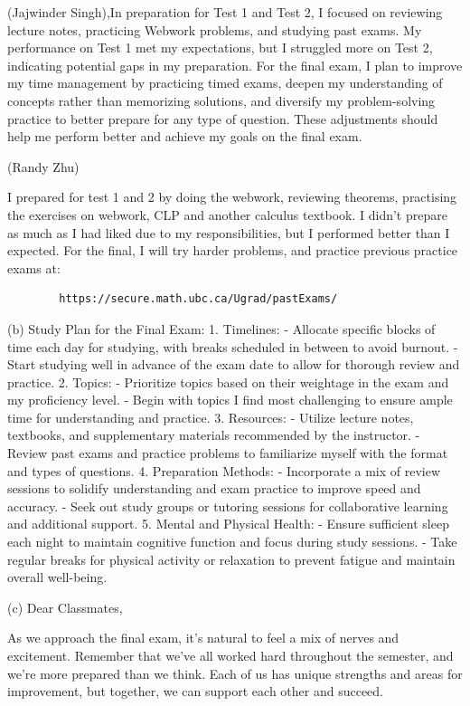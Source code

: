 \documentclass[answers]{exam}
\begin{document}
\begin{questions}
\begin{solution}
    (Jajwinder Singh),In preparation for Test 1 and Test 2, I focused on reviewing lecture notes, practicing Webwork problems, and studying past exams. My performance on Test 1 met my expectations, but I struggled more on Test 2, indicating potential gaps in my preparation. For the final exam, I plan to improve my time management by practicing timed exams, deepen my understanding of concepts rather than memorizing solutions, and diversify my problem-solving practice to better prepare for any type of question. These adjustments should help me perform better and achieve my goals on the final exam.

    (Randy Zhu)

    I prepared for test 1 and 2 by doing the webwork, reviewing theorems, practising the exercises on webwork, CLP and another calculus textbook. I didn't prepare as much as I had liked due to my responsibilities, but I performed better than I expected. For the final, I will try harder problems, and practice previous practice exams at: \begin{verbatim}
        https://secure.math.ubc.ca/Ugrad/pastExams/
    \end{verbatim}

    (b) Study Plan for the Final Exam:
    1. Timelines:
       - Allocate specific blocks of time each day for studying, with breaks scheduled in between to avoid burnout.
       - Start studying well in advance of the exam date to allow for thorough review and practice.
    2. Topics:
       - Prioritize topics based on their weightage in the exam and my proficiency level.
       - Begin with topics I find most challenging to ensure ample time for understanding and practice.
    3. Resources:
       - Utilize lecture notes, textbooks, and supplementary materials recommended by the instructor.
       - Review past exams and practice problems to familiarize myself with the format and types of questions.
    4. Preparation Methods:
       - Incorporate a mix of review sessions to solidify understanding and exam practice to improve speed and accuracy.
       - Seek out study groups or tutoring sessions for collaborative learning and additional support.
    5. Mental and Physical Health:
       - Ensure sufficient sleep each night to maintain cognitive function and focus during study sessions.
       - Take regular breaks for physical activity or relaxation to prevent fatigue and maintain overall well-being.
       
    (c) Dear Classmates,

        As we approach the final exam, it's natural to feel a mix of nerves and excitement. Remember that we've all worked hard throughout the semester, and we're more prepared than we think. Each of us has unique strengths and areas for improvement, but together, we can support each other and succeed.


\end{solution}
\end{questions}
\end{document}
